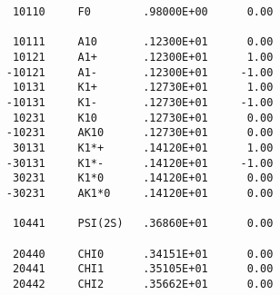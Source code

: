 \begin{verbatim}
      10110     F0        .98000E+00      0.00

      10111     A10       .12300E+01      0.00
      10121     A1+       .12300E+01      1.00
     -10121     A1-       .12300E+01     -1.00
      10131     K1+       .12730E+01      1.00
     -10131     K1-       .12730E+01     -1.00
      10231     K10       .12730E+01      0.00
     -10231     AK10      .12730E+01      0.00
      30131     K1*+      .14120E+01      1.00
     -30131     K1*-      .14120E+01     -1.00
      30231     K1*0      .14120E+01      0.00
     -30231     AK1*0     .14120E+01      0.00

      10441     PSI(2S)   .36860E+01      0.00

      20440     CHI0      .34151E+01      0.00
      20441     CHI1      .35105E+01      0.00
      20442     CHI2      .35662E+01      0.00



\end{verbatim}
